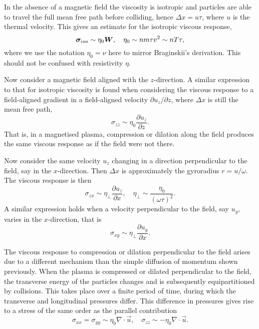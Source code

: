 In the absence of a magnetic field the viscosity is isotropic and particles are able to travel the full mean free path before colliding, hence $\Delta x = u \tau$, where $u$ is the thermal velocity. This gives an estimate for the isotropic viscous response,
\begin{equation}
  \label{eq:isotropic_eta_estimate}
  {\bm \sigma}_{iso} \sim \eta_0 {\bm W}, \quad \eta_0 \sim nm\tau v^2 \sim nT \tau,
\end{equation}
where we use the notation $\eta_0 = \nu$ here to mirror Braginskii's derivation. This should not be confused with resistivity $\eta$.

Now consider a magnetic field aligned with the $z$-direction. A similar expression to that for isotropic viscosity is found when considering the viscous response to a field-aligned gradient in a field-aligned velocity $\partial u_z / \partial z$, where $\Delta x$ is still the mean free path,
\begin{equation}
  \label{eq:parallel_eta_estimate}
\sigma_{zz} \sim \eta_0 \frac{\partial u_z}{\partial z}.
\end{equation}
That is, in a magnetised plasma, compression or dilation along the field produces the same viscous response as if the field were not there.

Now consider the same velocity $u_z$ changing in a direction perpendicular to the field, say in the $x$-direction. Then $\Delta x$ is approximately the gyroradius $r = u/\omega$. The viscous response is then
\begin{equation}
  \label{eq:perp_eta_estimate}
\sigma_{zx} \sim \eta_{\perp} \frac{\partial u_z}{\partial x}, \quad \eta_{\perp} \sim \frac{\eta_0}{(\omega \tau)^2}.
\end{equation}
A similar expression holds when a velocity perpendicular to the field, say $u_y$, varies in the $x$-direction, that is
\begin{equation}
  \label{eq:perp_eta_estimate2}
\sigma_{xy} \sim \eta_{\perp} \frac{\partial u_y}{\partial x}.
\end{equation}

The viscous response to compression or dilation perpendicular to the field arises due to a different mechanism than the simple diffusion of momentum shown previously. When the plasma is compressed or dilated perpendicular to the field, the transverse energy of the particles changes and is subsequently equipartitioned by collisions. This takes place over a finite period of time, during which the transverse and longitudinal pressures differ. This difference in pressures gives rise to a stress of the same order as the parallel contribution
\begin{equation}
  \label{eq:compression_eta_estimate}
\sigma_{xx} = \sigma_{yy} \sim \eta_0 \nabla \cdot \vec{u}, \quad \sigma_{zz} \sim - \eta_0 \nabla \cdot \vec{u}.
\end{equation}

